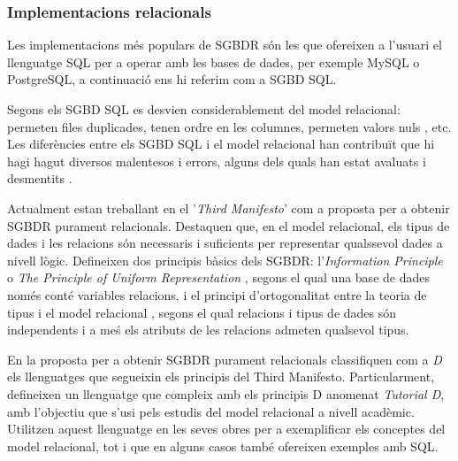 \subsubsection{Implementacions relacionals}


Les implementacions més populars de SGBDR són les que ofereixen a
l'usuari el llenguatge SQL per a operar amb les bases de dades, per
exemple MySQL o PostgreSQL, a continuació ens hi referim com a SGBD
SQL.  

Segons \textcite{datedarwen13:notosql_notonosql} els SGBD SQL es
desvien considerablement del model relacional: permeten files
duplicades, tenen ordre en les columnes, permeten valors
nuls \parencite{date08:nulls}, etc.  Les diferències entre els SGBD
SQL i el model relacional han contribuït que hi hagi hagut diversos
malentesos i errors, alguns dels quals han estat avaluats i
desmentits \parencite{dbdebunk,date06}.
  

Actualment \textcite{date:thethirdmanifesto} estan treballant en el
'\emph{Third Manifesto}' com a proposta per a obtenir SGBDR purament
relacionals. Destaquen que, en el model relacional, els tipus de dades
i les relacions són necessaris i suficients per representar qualssevol
dades a nivell lògic. %
Defineixen dos principis bàsics dels SGBDR: l'\emph{Information
  Principle} o \emph{The Principle of Uniform
  Representation} \parencite{date:dictionary}, segons el qual una base
de dades només conté variables relacions, i el principi
d'ortogonalitat entre la teoria de tipus i el model
relacional \parencite[cap.~6]{date06}, segons el qual relacions i
tipus de dades són independents i a meś els atributs de les relacions
admeten qualsevol tipus.  

En la proposta per a obtenir SGBDR purament relacionals
\textcite{date06:_datab_types_relat_model,date:tutoriald} classifiquen
com a \emph{D} els llenguatges que segueixin els principis del Third
Manifesto. Particularment, defineixen un llenguatge que compleix amb
els principis D anomenat \emph{Tutorial D}, amb l'objectiu que s'usi
pels estudis del model relacional a nivell acadèmic. Utilitzen aquest
llenguatge en les seves obres per a exemplificar els conceptes
del model relacional, tot i que en alguns casos també ofereixen
exemples amb SQL.


